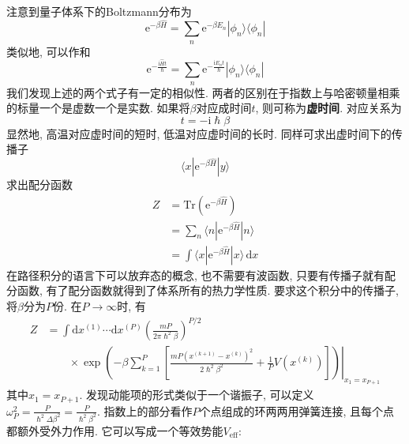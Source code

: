         注意到量子体系下的Boltzmann分布为
        \begin{equation}
            \mathrm{e}^{-\beta \hat{H}} = \sum_n \mathrm{e}^{-\beta E_n} |\phi_n \rangle \langle \phi_n|
        \end{equation}
        类似地, 可以作和
        \begin{equation}
            \mathrm{e}^{-\frac {\mathrm{i}\hat{H}t}{\hslash}} = \sum_n \mathrm{e}^{-\frac {\mathrm{i}E_n t}{\hslash}} |\phi_n \rangle \langle \phi_n|
        \end{equation}
        我们发现上述的两个式子有一定的相似性. 两者的区别在于指数上与哈密顿量相乘的标量一个是虚数一个是实数. 如果将$\beta$对应成时间$t$, 则可称为\textbf{虚时间}. 对应关系为
        \begin{equation}
            t = -\mathrm{i}\hslash \beta
        \end{equation}
        显然地, 高温对应虚时间的短时, 低温对应虚时间的长时. 同样可求出虚时间下的传播子
        \begin{equation}
            \langle x|\mathrm{e}^{-\beta \hat{H}}|y\rangle
        \end{equation}
        求出配分函数
        \begin{equation}\begin{aligned}
            Z &= \mathrm{Tr}(\mathrm{e}^{-\beta \hat{H}}) \\
            &= \sum_n \langle n| \mathrm{e}^{-\beta \hat{H}}|n\rangle \\
            &= \int \langle x|\mathrm{e}^{-\beta \hat{H}}|x\rangle \,\mathrm{d}x
        \end{aligned}\end{equation}
        在路径积分的语言下可以放弃态的概念, 也不需要有波函数, 只要有传播子就有配分函数, 有了配分函数就得到了体系所有的热力学性质. 要求这个积分中的传播子, 将$\beta$分为$P$份. 在$P \to \infty$时, 有
        \begin{equation}\begin{aligned}
            Z &= \int \mathrm{d} x^{(1)} \cdots \mathrm{d} x^{(P)} \left(\frac{mP}{2\pi \hslash^2 \beta}\right)^{P/2} \\ & \qquad\times\left.
            \exp\left( -\beta \sum_{k=1}^{P} \left[\frac{mP(x^{(k+1)}-x^{(k)})^2}{2\hslash^2 \beta^2}+\frac{1}{P}V(x^{(k)})\right]\right)\right|_{x_1 = x_{P+1}}
        \end{aligned}\end{equation}
        其中$x_1 = x_{P+1}$. 发现动能项的形式类似于一个谐振子, 可以定义$\omega_P^2 = \frac P{\hslash^2 \Delta \beta^2} = \frac P{\hslash^2 \beta^2}$. 指数上的部分看作$P$个点组成的环两两用弹簧连接, 且每个点都额外受外力作用. 它可以写成一个等效势能$V_\mathrm{eff}$:
